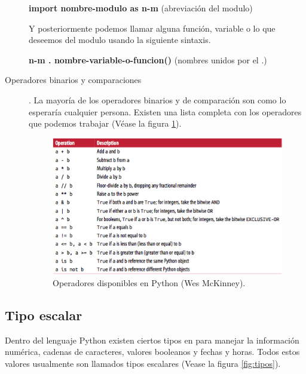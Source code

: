 \documentclass[a4paper]{article}
\begin{document}
\begin{description}
\begin{center}
	\textbf{import nombre-modulo as n-m} (abreviación del modulo)
\end{center}

Y posteriormente podemos llamar alguna función, variable o lo que deseemos del modulo usando la siguiente sintaxis.

\begin{center}
	\textbf{n-m . nombre-variable-o-funcion()} (nombres unidos por el .)
\end{center}

\item[Operadores binarios y comparaciones].
\newline La mayoría de los operadores binarios y de comparación son como lo esperaría cualquier persona. Existen una lista completa con los operadores que podemos trabajar (Véase la figura \ref{fig:operador}).

\begin{figure}[h!]
	\center
	\includegraphics[scale=.65]{./Images/operadores}
	\caption{\label{fig:operador} Operadores disponibles en Python (Wes McKinney).}
\end{figure}

\end{description}

\subsection{Tipo escalar}

Dentro del lenguaje Python existen ciertos tipos en para manejar la información numérica, cadenas de caracteres, valores booleanos y fechas y horas. Todos estos valores usualmente son llamados tipos escalares (Vease la figura \ref{fig:tipos}).
\end{document}
